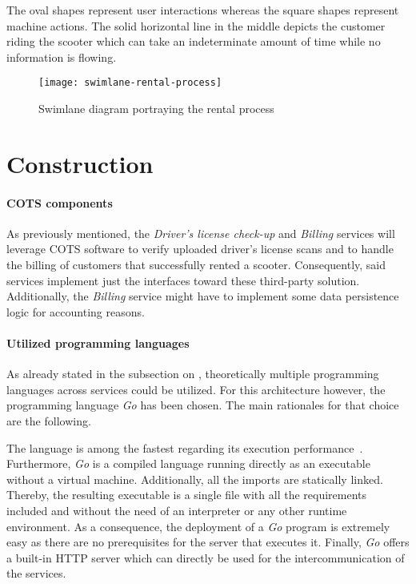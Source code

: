 \documentclass[12pt,a4paper,twoside]{report}
\begin{document}
The oval shapes represent user interactions whereas the square shapes represent
machine actions.
The solid horizontal line in the middle depicts the customer riding the scooter
which can take an indeterminate amount of time while no information is flowing.

\begin{figure}[htbp]
\centering
\texttt{[image: swimlane-rental-process]}
\caption{Swimlane diagram portraying the rental process}
\label{fig:swimlane-rental-process}
\end{figure}


\section{Construction} \label{subsect:analysis-construction}

\paragraph{COTS components}
As previously mentioned, the \textit{Driver's license check-up} and \textit{Billing}
services will leverage COTS software to verify uploaded driver's license scans
and to handle the billing of customers that successfully rented a scooter.
Consequently, said services implement just the interfaces toward these
third-party solution. Additionally, the \textit{Billing} service might have
to implement some data persistence logic for accounting reasons.

\paragraph{Utilized programming languages}
As already stated in the subsection on \textit{},
theoretically multiple programming languages across services could be utilized.
For this architecture however, the programming language \textit{Go} has been chosen.
The main rationales for that choice are the following.

The language is among the fastest regarding its execution performance~\cite{golang-fast}.
Furthermore, \textit{Go} is a compiled language running directly as an executable
without a virtual machine. Additionally, all the imports are statically linked.
Thereby, the resulting executable is a single file with all the requirements
included and without the need of an interpreter or any other runtime environment.
As a consequence, the deployment of a \textit{Go} program is extremely easy as
there are no prerequisites for the server that executes it.
Finally, \textit{Go} offers a built-in HTTP server which can directly be used
for the intercommunication of the services.
\end{document}
